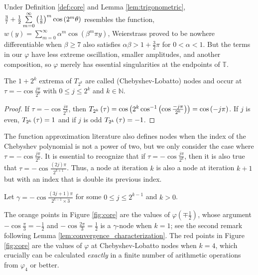 \begin{remark*}
Under Definition \ref{def:core} and Lemma \ref{lem:trigonometric}, $\frac{3}{7} + \frac{1}{2} \sum\limits_{m = 0}^\infty \left(\frac{1}{8}\right)^{m} \cos\left(2^m \theta\right)$ resembles the function, $w\left(y\right) = \sum\limits_{m = 0}^\infty \alpha^m \cos\left(\beta^m \pi y\right)$, Weierstrass proved to be nowhere differentiable when $\beta \geq 7$ also satisfies $\alpha \beta > 1 + \frac{3}{2} \pi$ for $0 < \alpha < 1$. But the terms in our $\varphi$ have less extreme oscillation, smaller amplitudes, and another composition, so $\varphi$ merely has essential singularities at the endpoints of $\mathbb{T}$.
\end{remark*}

\begin{lemma}
  \label{lem:nodes}
  The $1 + 2^k$ extrema of $T_{2^k}$ are called (Chebyshev-Lobatto) nodes and occur at $\tau = -\cos\frac{j\pi}{2^k}$ with $0 \leq j \leq 2^k$ and $k \in \mathbb{N}$.
\end{lemma}
\begin{proof}
  If $\tau = -\cos\frac{j\pi}{2^k}$, then $\TT[\tau]{k} = \cos\left(2^k \cos^{-1}\left(\cos \frac{-j\pi}{2^k}\right)\right) = \cos\left(-j\pi\right)$. If $j$ is even, $\TT[\tau]{k} = 1$ and if $j$ is odd $\TT[\tau]{k} = -1$.
\end{proof}
The function approximation literature also defines nodes when the index of the Chebyshev polynomial is not a power of two, but we only consider the case where $\tau = -\cos\frac{j\pi}{2^k}$. It is essential to recognize that if $\tau = -\cos\frac{j\pi}{2^k}$, then it is also true that $\tau = -\cos\frac{\left(2j\right)\pi}{2^{k + 1}}$. Thus, a node at iteration $k$ is also a node at iteration $k + 1$ but with an index that is double its previous index.

\begin{definition}
  \label{def:gamma_nodes}
  Let $\gamma = -\cos\frac{\left(3j + 1\right)\pi}{2^{k - 1} \times 3}$ for some $0 \leq j \leq 2^{k - 1}$ and $k > 0$.
\end{definition}

The orange points in Figure \ref{fig:core} are the values of $\varphi\left(\mp \frac{1}{2}\right)$, whose argument $-\cos\frac{\pi}{3} = -\frac{1}{2}$ and $-\cos\frac{2\pi}{3} = \frac{1}{2}$ is a $\gamma$-node when $k = 1$; see the second remark following Lemma \ref{lem:convergence_characterization}. The red points in Figure \ref{fig:core} are the values of $\varphi$ at Chebyshev-Lobatto nodes when $k = 4$, which crucially can be calculated \emph{exactly} in a finite number of arithmetic operations from $\varphi_4$ or better.

